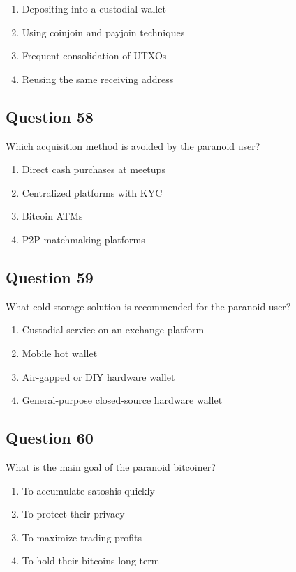\documentclass[12pt,a4paper]{article}
\begin{document}
\begin{enumerate}[label=\Alph*., leftmargin=*]
\item Depositing into a custodial wallet
\item Using coinjoin and payjoin techniques
\item Frequent consolidation of UTXOs
\item Reusing the same receiving address
\end{enumerate}

\bigskip


\subsection*{Question 58}
Which acquisition method is avoided by the paranoid user?

\begin{enumerate}[label=\Alph*., leftmargin=*]
\item Direct cash purchases at meetups
\item Centralized platforms with KYC
\item Bitcoin ATMs
\item P2P matchmaking platforms
\end{enumerate}

\bigskip


\subsection*{Question 59}
What cold storage solution is recommended for the paranoid user?

\begin{enumerate}[label=\Alph*., leftmargin=*]
\item Custodial service on an exchange platform
\item Mobile hot wallet
\item Air-gapped or DIY hardware wallet
\item General-purpose closed-source hardware wallet
\end{enumerate}

\bigskip


\subsection*{Question 60}
What is the main goal of the paranoid bitcoiner?

\begin{enumerate}[label=\Alph*., leftmargin=*]
\item To accumulate satoshis quickly
\item To protect their privacy
\item To maximize trading profits
\item To hold their bitcoins long-term
\end{enumerate}
\end{document}
